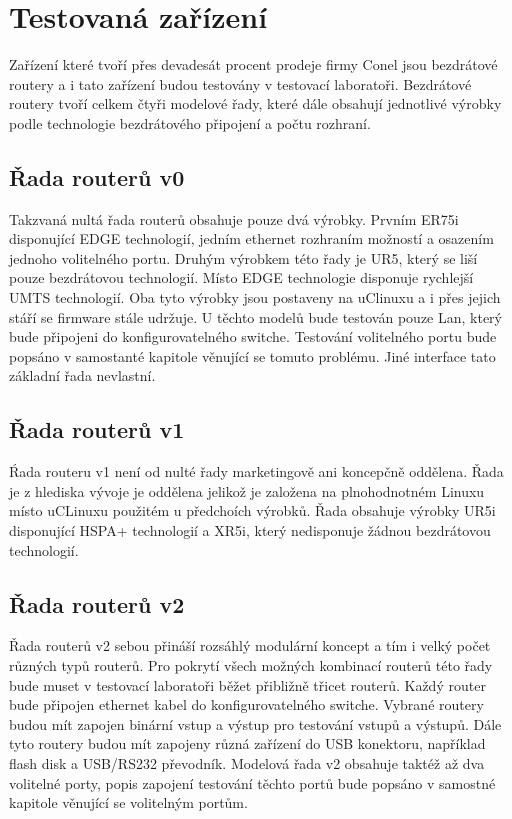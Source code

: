 \section{Testovaná zařízení}
Zařízení které tvoří přes devadesát procent prodeje firmy Conel jsou bezdrátové routery a i tato zařízení budou testovány v testovací laboratoři. Bezdrátové routery tvoří celkem čtyři modelové řady, které dále obsahují jednotlivé výrobky podle technologie bezdrátového připojení a počtu rozhraní.

\subsection{Řada routerů v0}
Takzvaná nultá řada routerů obsahuje pouze dvá výrobky. Prvním ER75i disponující EDGE technologií, jedním ethernet rozhraním možností a osazením jednoho volitelného portu.  Druhým výrobkem této řady je UR5, který se liší pouze bezdrátovou technologií. Místo EDGE technologie disponuje rychlejší UMTS technologií. Oba tyto výrobky jsou postaveny na uClinuxu a i přes jejich stáří se firmware stále udržuje. U těchto modelů bude testován pouze Lan, který bude připojeni do konfigurovatelného switche. Testování volitelného portu bude popsáno v samostanté kapitole věnující se tomuto problému. Jiné interface tato základní řada nevlastní.

\subsection{Řada routerů v1}
Ŕada routeru v1 není od nulté řady marketingově ani koncepčně oddělena. Řada je z hlediska vývoje je oddělena jelikož je založena na plnohodnotném Linuxu místo uCLinuxu použitém u předchoích výrobků. Řada obsahuje výrobky UR5i disponující HSPA+ technologií a XR5i, který nedisponuje žádnou bezdrátovou technologií.

\subsection{Řada routerů v2}
Řada routerů v2 sebou přináší rozsáhlý modulární koncept a tím i velký počet různých typů routerů. Pro pokrytí všech možných kombinací routerů této řady bude muset v testovací laboratoři běžet přibližně třicet routerů. Každý router bude připojen ethernet kabel do konfigurovatelného switche. Vybrané routery budou mít zapojen binární vstup a výstup pro testování vstupů a výstupů. Dále tyto routery budou mít zapojeny různá zařízení do USB konektoru, například flash disk a USB/RS232 převodník. Modelová řada v2 obsahuje taktéž až dva volitelné porty, popis zapojení testování těchto portů bude popsáno v samostné kapitole věnující se volitelným portům.

